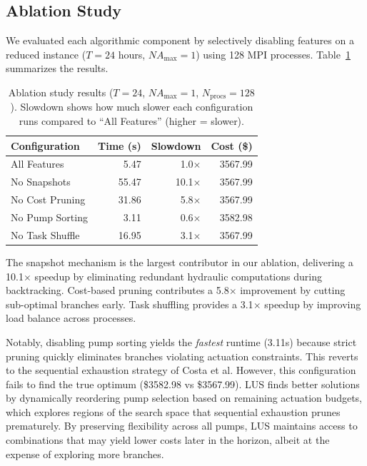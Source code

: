 \documentclass[a4paper,fleqn]{cas-dc}
\begin{document}
\subsection{Ablation Study}

We evaluated each algorithmic component by selectively disabling features on a reduced instance ($T=24$ hours, $NA_{\max}=1$) using 128 MPI processes. Table~\ref{tab:ablation} summarizes the results.

\begin{table}[htbp]
	\centering
	\caption{Ablation study results ($T=24$, $NA_{\max}=1$, $N_{\text{procs}}=128$). Slowdown shows how much slower each configuration runs compared to ``All Features'' (higher = slower).}
	\label{tab:ablation}
	\small
	\begin{tabular}{@{}lrrr@{}}
		\hline
		Configuration   & Time (s) & Slowdown     & Cost (\$) \\
		\hline
		All Features    & 5.47     & 1.0$\times$  & 3567.99   \\
		No Snapshots    & 55.47    & 10.1$\times$ & 3567.99   \\
		No Cost Pruning & 31.86    & 5.8$\times$  & 3567.99   \\
		No Pump Sorting & 3.11     & 0.6$\times$  & 3582.98   \\
		No Task Shuffle & 16.95    & 3.1$\times$  & 3567.99   \\
		\hline
	\end{tabular}
\end{table}

The snapshot mechanism is the largest contributor in our ablation, delivering a 10.1$\times$ speedup by eliminating redundant hydraulic computations during backtracking. Cost-based pruning contributes a 5.8$\times$ improvement by cutting sub-optimal branches early. Task shuffling provides a 3.1$\times$ speedup by improving load balance across processes.

Notably, disabling pump sorting yields the \emph{fastest} runtime (3.11s) because strict pruning quickly eliminates branches violating actuation constraints. This reverts to the sequential exhaustion strategy of Costa et al. However, this configuration fails to find the true optimum (\$3582.98 vs \$3567.99). LUS finds better solutions by dynamically reordering pump selection based on remaining actuation budgets, which explores regions of the search space that sequential exhaustion prunes prematurely. By preserving flexibility across all pumps, LUS maintains access to combinations that may yield lower costs later in the horizon, albeit at the expense of exploring more branches.
\end{document}
